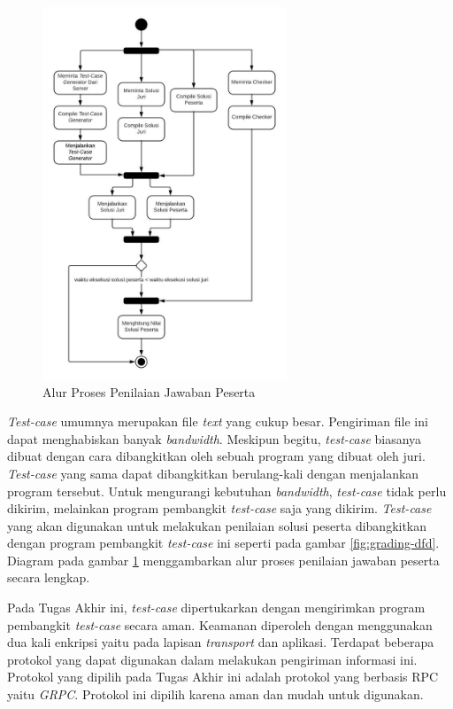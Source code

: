 \begin{figure}
    \centering
    \includegraphics[width=0.65\textwidth]{images/total-grader-activity}
    \caption{Alur Proses Penilaian Jawaban Peserta}
    \label{fig:total-grader-activity}
\end{figure}

\par \textit{Test-case} umumnya merupakan file \textit{text} yang cukup besar. Pengiriman file ini dapat menghabiskan banyak \textit{bandwidth}. Meskipun begitu, \textit{test-case} biasanya dibuat dengan cara dibangkitkan oleh sebuah program yang dibuat oleh juri. \textit{Test-case} yang sama dapat dibangkitkan berulang-kali dengan menjalankan program tersebut. Untuk mengurangi kebutuhan \textit{bandwidth}, \textit{test-case} tidak perlu dikirim, melainkan program pembangkit \textit{test-case} saja yang dikirim. \textit{Test-case} yang akan digunakan untuk melakukan penilaian solusi peserta dibangkitkan dengan program pembangkit \textit{test-case} ini seperti pada gambar \ref{fig:grading-dfd}. Diagram pada gambar \ref{fig:total-grader-activity} menggambarkan alur proses penilaian jawaban peserta secara lengkap.

\par Pada Tugas Akhir ini, \textit{test-case} dipertukarkan dengan mengirimkan program pembangkit \textit{test-case} secara aman. Keamanan diperoleh dengan menggunakan dua kali enkripsi yaitu pada lapisan \textit{transport} dan aplikasi. Terdapat beberapa protokol yang dapat digunakan dalam melakukan pengiriman informasi ini. Protokol yang dipilih pada Tugas Akhir ini adalah protokol yang berbasis RPC yaitu \textit{GRPC}. Protokol ini dipilih karena aman dan mudah untuk digunakan.

